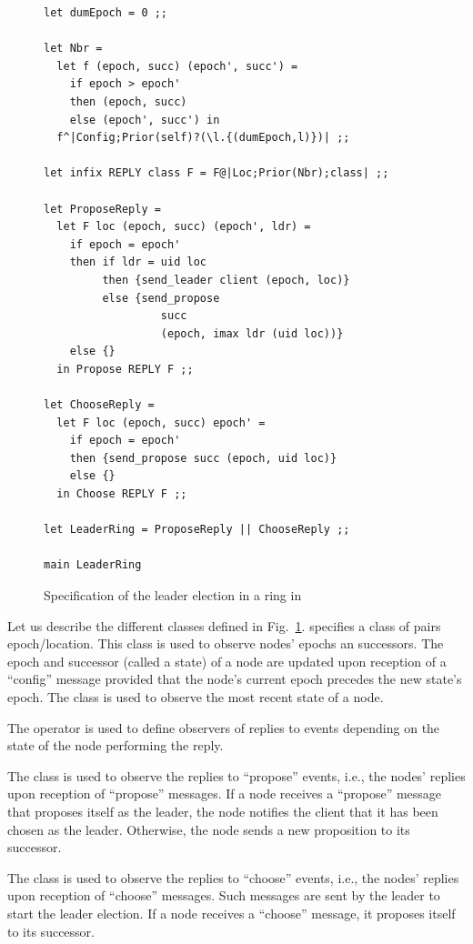 \documentclass[final]{article}
\begin{document}
\begin{figure}[!t]
  \begin{center}
\begin{lstlisting}
let dumEpoch = 0 ;;

let Nbr =
  let f (epoch, succ) (epoch', succ') =
    if epoch > epoch'
    then (epoch, succ)
    else (epoch', succ') in
  f^|Config;Prior(self)?(\l.{(dumEpoch,l)})| ;;

let infix REPLY class F = F@|Loc;Prior(Nbr);class| ;;

let ProposeReply =
  let F loc (epoch, succ) (epoch', ldr) =
    if epoch = epoch'
    then if ldr = uid loc
         then {send_leader client (epoch, loc)}
         else {send_propose
                  succ
                  (epoch, imax ldr (uid loc))}
    else {}
  in Propose REPLY F ;;

let ChooseReply =
  let F loc (epoch, succ) epoch' =
    if epoch = epoch'
    then {send_propose succ (epoch, uid loc)}
    else {}
  in Choose REPLY F ;;

let LeaderRing = ProposeReply || ChooseReply ;;

main LeaderRing
\end{lstlisting}
  \end{center}
  \caption{Specification of the leader election in a ring in \eml}
  \label{fig:LR_spec}
\end{figure}

Let us describe the different classes defined in
Fig.~\ref{fig:LR_spec}.   specifies a class of pairs
epoch/location.  This class is used to observe nodes' epochs an
successors.  The epoch and successor (called a state) of a node are
updated upon reception of a ``config'' message provided that the
node's current epoch precedes the new state's epoch.
%
The class  is used to observe the most recent state
of a node.

The  operator is used to define observers of replies
to events depending on the state of the node performing the reply.

The class  is used to observe the replies to
``propose'' events, i.e., the nodes' replies upon reception of
``propose'' messages.  If a node receives a ``propose'' message that
proposes itself as the leader, the node notifies the client that it
has been chosen as the leader.  Otherwise, the node sends a new
proposition to its successor.

The class  is used to observe the replies to
``choose'' events, i.e., the nodes' replies upon reception of
``choose'' messages.  Such messages are sent by the leader to start
the leader election.  If a node receives a ``choose'' message, it
proposes itself to its successor.
\end{document}
